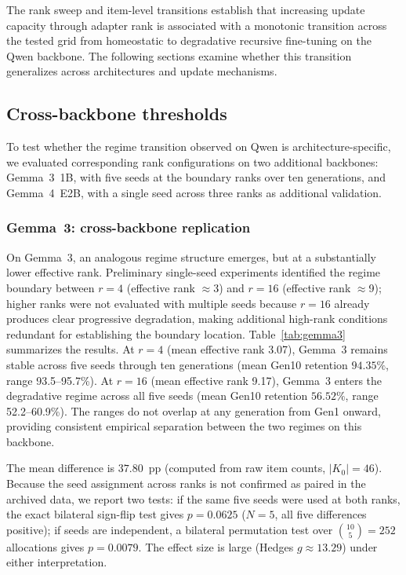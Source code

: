 \documentclass[a4paper,fleqn]{cas-dc}
\newif\ifshowchanges
\newcommand{\rev}[1]{\ifshowchanges{\color{blue}#1}\else{#1}\fi}
\begin{document}
The rank sweep and item-level transitions establish that increasing update
capacity through adapter rank \rev{is associated with a monotonic transition across the tested grid}
from homeostatic to degradative recursive fine-tuning on the Qwen backbone. The
following sections examine whether this transition generalizes across
architectures and update mechanisms.

\subsection{Cross-backbone thresholds}\label{sec:res_backbone}

To test whether the regime transition observed on Qwen is architecture-specific,
we evaluated corresponding rank configurations on two additional backbones:
Gemma~3~1B, with five seeds at the boundary ranks over ten generations, and
Gemma~4~E2B, with a single seed across three ranks as additional validation.

\subsubsection{Gemma~3: cross-backbone replication}

On Gemma~3, an analogous regime structure emerges, but at a substantially lower
effective rank. Preliminary single-seed experiments identified the regime
boundary between $r=4$ (effective rank ${\approx}$3) and $r=16$ (effective rank
${\approx}$9); higher ranks were not evaluated with multiple seeds because $r=16$
already produces clear progressive degradation, making additional high-rank
conditions redundant for establishing the boundary location.
Table~\ref{tab:gemma3} summarizes the results. At $r=4$ (mean
effective rank 3.07), Gemma~3 remains stable across five seeds through ten
generations (mean Gen10 retention \rev{$94.35\%$, range 93.5--95.7\%}).
At $r=16$ (mean effective rank 9.17), Gemma~3 enters the degradative regime
across all five seeds (mean Gen10 retention \rev{$56.52\%$,
range 52.2--60.9\%}). The ranges do not
overlap at any generation from Gen1 onward, providing consistent empirical
separation between the two regimes on this backbone.

\rev{The mean difference is $37.80$~pp (computed from raw item counts,
$|K_0|=46$). Because the seed assignment across ranks is not confirmed
as paired in the archived data, we report two tests: if the same five seeds were
used at both ranks, the exact bilateral sign-flip test gives $p=0.0625$
($N=5$, all five differences positive); if seeds are independent, a bilateral
permutation test over $\binom{10}{5}=252$ allocations gives
$p=0.0079$. The effect size is large (Hedges $g \approx 13.29$)
under either interpretation.}
\end{document}
